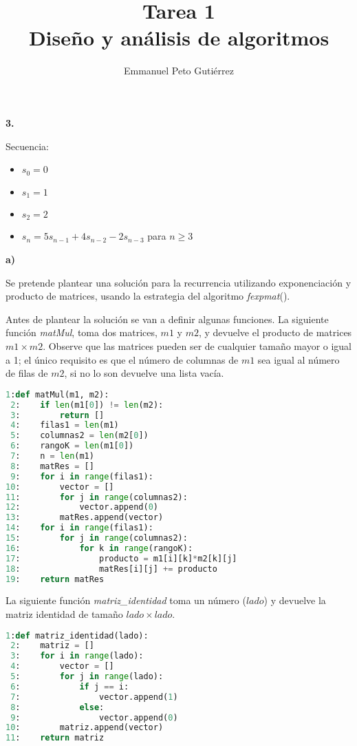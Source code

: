 \documentclass{article}
\title{Tarea 1\\Diseño y análisis de algoritmos}
\author{Emmanuel Peto Gutiérrez}
\begin{document}

\textbf{3.}

Secuencia:

\begin{itemize}
\item $s_0 = 0$
\item $s_1 = 1$
\item $s_2 = 2$
\item $s_n = 5s_{n-1} + 4s_{n-2} - 2s_{n-3}$ para $n \geq 3$
\end{itemize}

\textbf{a)}

Se pretende plantear una solución para la recurrencia utilizando exponenciación y producto de matrices, usando la estrategia del algoritmo \textit{fexpmat}().

Antes de plantear la solución se van a definir algunas funciones. La siguiente función \textit{matMul}, toma dos matrices, $m1$ y $m2$, y devuelve el producto de matrices $m1 \times m2$. Observe que las matrices pueden ser de cualquier tamaño mayor o igual a 1; el único requisito es que el número de columnas de $m1$ sea igual al número de filas de $m2$, si no lo son devuelve una lista vacía.

\begin{lstlisting}[language=Python]
 1:def matMul(m1, m2):
 2:    if len(m1[0]) != len(m2):
 3:        return []
 4:    filas1 = len(m1)
 5:    columnas2 = len(m2[0])
 6:    rangoK = len(m1[0])
 7:    n = len(m1)
 8:    matRes = []
 9:    for i in range(filas1):
10:        vector = []
11:        for j in range(columnas2):
12:            vector.append(0)
13:        matRes.append(vector)
14:    for i in range(filas1):
15:        for j in range(columnas2):
16:            for k in range(rangoK):
17:                producto = m1[i][k]*m2[k][j]
18:                matRes[i][j] += producto
19:    return matRes
\end{lstlisting}

La siguiente función \textit{matriz\_identidad} toma un número ($lado$) y devuelve la matriz identidad de tamaño $lado \times lado$.

\begin{lstlisting}[language=Python]
 1:def matriz_identidad(lado):
 2:    matriz = []
 3:    for i in range(lado):
 4:        vector = []
 5:        for j in range(lado):
 6:            if j == i:
 7:                vector.append(1)
 8:            else:
 9:                vector.append(0)
10:        matriz.append(vector)
11:    return matriz
\end{lstlisting}
\end{document}
